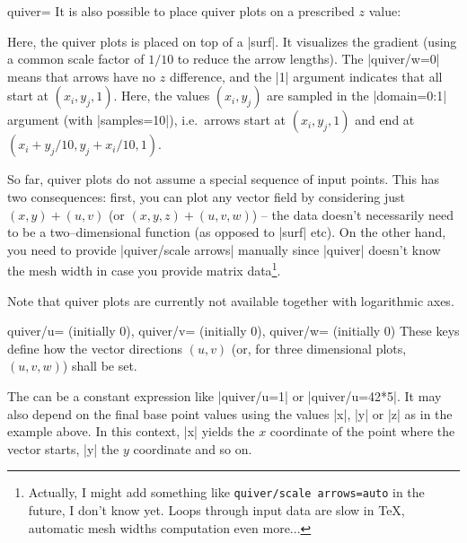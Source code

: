 {\begin{plottype}[/pgfplots]{quiver=\textcolor{black}{}}
	It is also possible to place quiver plots on a prescribed $z$ value:
\pgfplotsexpensiveexample
\begin{codeexample}[]
\end{codeexample}
	\noindent Here, the quiver plots is placed on top of a |surf|. It visualizes the gradient (using a common scale factor of $1/10$ to reduce the arrow lengths). The |quiver/w=0| means that arrows have no $z$ difference, and the |{1}| argument indicates that all start at $(x_i,y_j,1)$. Here, the values $(x_i,y_j)$ are sampled in the |domain=0:1| argument (with |samples=10|), i.e.\ arrows start at $(x_i,y_j,1)$ and end at $(x_i+y_j/10, y_j+x_i/10, 1)$.

	So far, quiver plots do not assume a special sequence of input points. This has two consequences: first, you can plot any vector field by considering just $(x,y) + (u,v)$ (or $(x,y,z) + (u,v,w)$) -- the data doesn't necessarily need to be a two--dimensional function (as opposed to |surf| etc). On the other hand, you need to provide |quiver/scale arrows| manually since |quiver| doesn't know the mesh width in case you provide matrix data\footnote{Actually, I might add something like \texttt{quiver/scale arrows=auto} in the future, I don't know yet. Loops through input data are slow in \TeX, automatic mesh widths computation even more...}.

	Note that quiver plots are currently not available together with logarithmic axes.

	\begin{pgfplotskeylist}{%
		quiver/u= (initially 0),
		quiver/v= (initially 0),
		quiver/w= (initially 0)}
		These keys define how the vector directions $(u,v)$ (or, for three dimensional plots, $(u,v,w)$) shall be set.

		The  can be a constant expression like |quiver/u=1| or |quiver/u=42*5|. It may also depend on the final base point values using the values |x|, |y| or |z| as in the example above. In this context, |x| yields the $x$ coordinate of the point where the vector starts, |y| the $y$ coordinate and so on. 


\end{pgfplotskeylist}
\end{plottype}}

